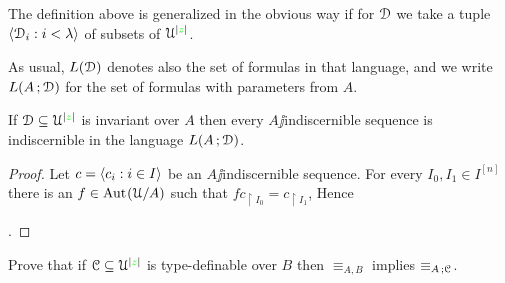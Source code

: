 \documentclass[creche.tex]{subfiles}
\begin{document}
The definition above is generalized in the obvious way if for $\EuScript D$ we take a tuple $\langle\EuScript D_i:i<\lambda\rangle$ of subsets of $\EuScript U^{|{\color{green} z}|}$.

As usual, $L(\EuScript D)$ denotes also the set of formulas in that language, and we write  $L(A\,;\EuScript D)$ for the set of formulas with parameters from $A$.


\begin{proposition}\label{prop_indiscernible_L(A,D)}
If $\EuScript D\subseteq\EuScript U^{|{\color{green} z}|}$ is invariant over $A$ then every $A\jj$indiscernible sequence is indiscernible in the language $L(A\,;\EuScript D)$.
\end{proposition}

\begin{proof}
Let $c=\langle c_i:i\in I\rangle$ be an $A\jj$indiscernible sequence. For every $I_0,I_1\in I^{[n]}$ there is an $f\in\textrm{Aut\kern.15ex}(\EuScript U/A)$ such that $fc_{\restriction I_0}=c_{\restriction I_1}$, Hence 

.
\end{proof}



\begin{exercise}
Prove that if $\EuScript C\subseteq\EuScript U^{|{\color{green} z}|}$ is type-definable over $B$ then $\equiv_{A,B}$ implies $\equiv_{A\,;\EuScript C}$.\QED
\end{exercise} 
\end{document}
